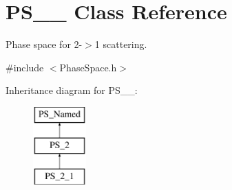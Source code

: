 \hypertarget{classPS__2__1}{}\section{P\+S\+\_\+\_ Class Reference}
\label{classPS__2__1}


Phase space for 2-\/$>$1 scattering.  




{\ttfamily \#include $<$Phase\+Space.\+h$>$}

Inheritance diagram for P\+S\+\_\+\_\+:\begin{figure}[H]
\begin{center}
\leavevmode
\includegraphics[height=3.000000cm]{classPS__2__1}
\end{center}
\end{figure}
